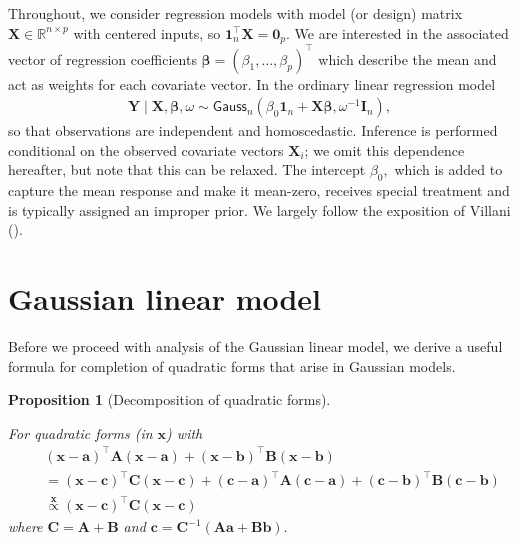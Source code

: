 \documentclass[
  11pt,
  letterpaper,
]{scrbook}
\theoremstyle{definition}
\theoremstyle{plain}
\theoremstyle{plain}
\theoremstyle{plain}
\newtheorem{proposition}{Proposition}[chapter]
\theoremstyle{definition}
\theoremstyle{definition}
\theoremstyle{remark}
\begin{document}
Throughout, we consider regression models with model (or design) matrix
\(\mathbf{X} \in \mathbb{R}^{n \times p}\) with centered inputs, so
\(\mathbf{1}_n^\top\mathbf{X}=\mathbf{0}_p.\) We are interested in the
associated vector of regression coefficients
\(\boldsymbol{\beta} = (\beta_1, \ldots, \beta_p)^\top\) which describe
the mean and act as weights for each covariate vector. In the ordinary
linear regression model \begin{align*}
\boldsymbol{Y} \mid \mathbf{X}, \boldsymbol{\beta}, \omega \sim \mathsf{Gauss}_n(\beta_0\mathbf{1}_n + \mathbf{X}\boldsymbol{\beta}, \omega^{-1}\mathbf{I}_n),
\end{align*} so that observations are independent and homoscedastic.
Inference is performed conditional on the observed covariate vectors
\(\mathbf{X}_i\); we omit this dependence hereafter, but note that this
can be relaxed. The intercept \(\beta_0,\) which is added to capture the
mean response and make it mean-zero, receives special treatment and is
typically assigned an improper prior. We largely follow the exposition
of Villani ().

\section{Gaussian linear model}\label{gaussian-linear-model}

Before we proceed with analysis of the Gaussian linear model, we derive
a useful formula for completion of quadratic forms that arise in
Gaussian models.

\begin{proposition}[Decomposition of quadratic
forms]\protect\hypertarget{prp-quadratic-forms}{}\label{prp-quadratic-forms}

For quadratic forms (in \(\boldsymbol{x}\)) with \begin{align*}
& (\boldsymbol{x} - \boldsymbol{a})^\top \mathbf{A}(\boldsymbol{x} - \boldsymbol{a}) + (\boldsymbol{x} - \boldsymbol{b})^\top \mathbf{B}(\boldsymbol{x} - \boldsymbol{b}) \\\quad &=
 (\boldsymbol{x} - \boldsymbol{c})^\top \mathbf{C}(\boldsymbol{x} - \boldsymbol{c}) + (\boldsymbol{c}-\boldsymbol{a})^\top\mathbf{A}(\boldsymbol{c}-\boldsymbol{a}) + (\boldsymbol{c}-\boldsymbol{b})^\top\mathbf{B}(\boldsymbol{c}-\boldsymbol{b})\\
&\stackrel{\boldsymbol{x}}{\propto} (\boldsymbol{x} - \boldsymbol{c})^\top \mathbf{C}(\boldsymbol{x} - \boldsymbol{c})
\end{align*} where \(\mathbf{C} = \mathbf{A} + \mathbf{B}\) and
\(\boldsymbol{c}= \mathbf{C}^{-1}(\mathbf{A}\boldsymbol{a} + \mathbf{B}\boldsymbol{b}).\)

\end{proposition}
\end{document}
